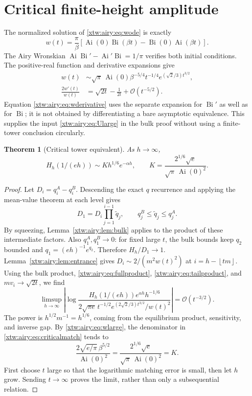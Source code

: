 \documentclass[11pt]{article}
\newtheorem{theorem}{Theorem}[section]
\theoremstyle{remark}\newtheorem{remark}[theorem]{Remark}
\newcommand{\OO}{\mathcal O}
\newcommand{\Ai}{\operatorname{Ai}}
\newcommand{\Bi}{\operatorname{Bi}}
\newcommand{\floor}[1]{\left\lfloor #1\right\rfloor}
\begin{document}
\section{Critical finite-height amplitude}\label{xtw:airy:sec:critical}
The normalized solution of \eqref{xtw:airy:eq:wode} is exactly
\begin{equation}\label{xtw:airy:eq:airyw}
 w(t)=\frac\pi\beta\left[\Ai(0)\Bi(\beta t)-\Bi(0)\Ai(\beta t)\right].
\end{equation}
The Airy Wronskian $\Ai\Bi'-\Ai'\Bi=1/\pi$ verifies both initial conditions.
The positive-real function and derivative expansions \cite{dlmf2,dlmf7} give
\begin{align}
 w(t)&\sim\sqrt\pi\,\Ai(0)\beta^{-5/4}t^{-1/4}
         e^{(\sqrt2/3)t^{3/2}},\label{xtw:airy:eq:wlarge}\\
 \frac{2w'(t)}{w(t)}&=\sqrt{2t}-\frac1{2t}+\OO(t^{-5/2}).\label{xtw:airy:eq:wderivative}
\end{align}
Equation \eqref{xtw:airy:eq:wderivative} uses the separate expansion for $\Bi'$ as well
as for $\Bi$; it is not obtained by differentiating a bare asymptotic
equivalence. This supplies the input \eqref{xtw:airy:eq:Ularge} in the bulk proof
without using a finite-tower conclusion circularly.

\begin{theorem}[Critical tower equivalent]\label{xtw:airy:thm:critical}
As $h\to\infty$,
\begin{equation}\label{xtw:airy:eq:critical}
 H_h(1/(eh))\sim K h^{1/6}e^{-\alpha h},\qquad
 K=\frac{2^{1/6}\sqrt e}{\sqrt\pi\,\Ai(0)^2}.
\end{equation}
\end{theorem}
\begin{proof}
Let $D_i=q_i^A-q_i^B$. Descending the exact $q$ recurrence and applying the
mean-value theorem at each level gives
\[
 D_1=D_i\prod_{j=1}^{i-1}\widetilde q_j,
 \qquad q_j^B\le\widetilde q_j\le q_j^A.
\]
By squeezing, Lemma~\ref{xtw:airy:lem:bulk} applies to the product of these intermediate
factors. Also $q_1^A,q_1^B\to0$: for fixed large $t$, the bulk bounds keep
$q_2$ bounded and $q_1=(eh)^{-1}e^{q_2}$. Therefore
$H_h/D_1\to1$. Lemma~\ref{xtw:airy:lem:entrance} gives
$D_i\sim2/(m^2w(t)^2)$ at $i=h-\floor{tm}$.
Using the bulk product, \eqref{xtw:airy:eq:fullproduct}, \eqref{xtw:airy:eq:tailproduct}, and
$mv_i\to\sqrt{2t}$, we find
\begin{equation}\label{xtw:airy:eq:criticalmatch}
 \limsup_{h\to\infty}\left|
 \log\frac{H_h(1/(eh))e^{\alpha h}h^{-1/6}}
 {2\sqrt{\pi e}\,t^{-1/2}e^{(2\sqrt2/3)t^{3/2}}/w(t)^2}
 \right|=\OO(t^{-3/2}).
\end{equation}
The power is $h^{1/2}m^{-1}=h^{1/6}$, coming from the equilibrium product,
sensitivity, and inverse gap. By \eqref{xtw:airy:eq:wlarge}, the denominator in
\eqref{xtw:airy:eq:criticalmatch} tends to
\[
 \frac{2\sqrt{e/\pi}\,\beta^{5/2}}{\Ai(0)^2}
 =\frac{2^{1/6}\sqrt e}{\sqrt\pi\,\Ai(0)^2}=K.
\]
First choose $t$ large so that the logarithmic matching error is small, then
let $h$ grow. Sending $t\to\infty$ proves the limit, rather than only a
subsequential relation.
\end{proof}
\end{document}

